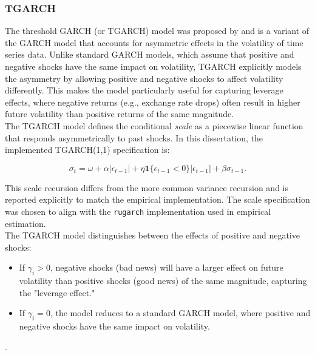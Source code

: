 \documentclass[oneside,12pt]{CUEDthesisPSnPDF}
\newcommand{\textcite}{\citet}
\begin{document}

\subsubsection{TGARCH}
\noindent 
The threshold GARCH (or TGARCH) model was proposed by \textcite{zakoian1994threshold} and is a variant of the GARCH model that accounts for asymmetric effects in the volatility of time series data. Unlike standard GARCH models, which assume that positive and negative shocks have the same impact on volatility, TGARCH explicitly models the asymmetry by allowing positive and negative shocks to affect volatility differently. This makes the model particularly useful for capturing leverage effects, where negative returns (e.g., exchange rate drops) often result in higher future volatility than positive returns of the same magnitude.\\

The TGARCH model defines the conditional \emph{scale} as a piecewise linear function that responds asymmetrically to past shocks. In this dissertation, the implemented TGARCH(1,1) specification is:

\begin{equation}
\sigma_t = \omega + \alpha |\epsilon_{t-1}| + \eta \mathbf{1}\{\epsilon_{t-1}<0\}|\epsilon_{t-1}| + \beta \sigma_{t-1}.
\end{equation}

This scale recursion differs from the more common variance recursion and is reported explicitly to match the empirical implementation. The scale specification was chosen to align with the \texttt{rugarch} implementation used in empirical estimation.\\

The TGARCH model distinguishes between the effects of positive and negative shocks:
\begin{itemize}
    \item If \( \gamma_{i} > 0 \), negative shocks (bad news) will have a larger effect on future volatility than positive shocks (good news) of the same magnitude, capturing the "leverage effect."
    \item If \( \gamma_{i} = 0 \), the model reduces to a standard GARCH model, where positive and negative shocks have the same impact on volatility.
\end{itemize}.

\end{document}
